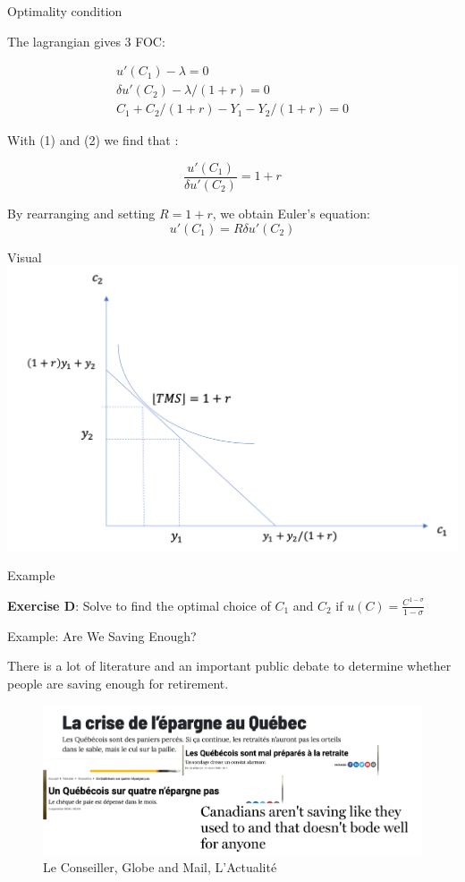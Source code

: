 \documentclass[handout]{beamer}
\begin{document}
\begin{frame}{Optimality condition}

The lagrangian gives 3 FOC:

\begin{eqnarray}
 u'(C_1) - \lambda = 0  \\
\delta u'(C_2) - \lambda /(1+r) = 0  \\
C_1+C_2/(1+r) - Y_1 - Y_2/(1+r) = 0  
\end{eqnarray}

With (1) and (2) we find that : 

$$ \frac{u'(C_1)}{\delta u'(C_2)} = 1+r $$

By rearranging and setting $R=1+r$, we obtain Euler's equation: 
$$ u'(C_1) = R\delta u'(C_2) $$
\end{frame}

\begin{frame}{Visual}
\includegraphics[scale=0.5]{optimal.png}
\end{frame}

\begin{frame}{Example}

\textbf{Exercise D}: Solve to find the optimal choice of $C_1$ and $C_2$ if $u(C)=\frac{C^{1-\sigma}}{1-\sigma}$

\end{frame}

\begin{frame}{Example: Are We Saving Enough?}

There is a lot of literature and an important public debate to determine whether people are saving enough for retirement.

\begin{figure}
	\includegraphics[scale=0.4]{retraite.png} 
	\caption{Le Conseiller, Globe and Mail, L'Actualité}
\end{figure}

\end{frame}
\end{document}
